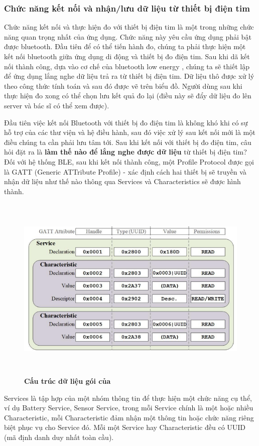 \subsubsection{Chức năng kết nối và nhận/lưu dữ liệu từ thiết bị điện tim}
\mbox{}

Chức năng kết nối và thực hiện đo với thiết bị điện tim là một trong những chức năng quan trọng nhất của ứng dụng. Chức năng này yêu cầu
ứng dụng phải bật được bluetooth. Đầu tiên để có thể tiến hành đo, chúng ta phải thực hiện một kết nối bluetooth giữa ứng dụng di động và
thiết bị đo điện tim. Sau khi dã kết nối thành công, dựa vào cơ chế của bluetooth low energy \cite{intro_ble}, chúng ta sẽ thiết lập để ứng dụng lắng
nghe dữ liệu trả ra từ thiết bị điện tim. Dữ liệu thô được xử lý theo công thức tính toán và sau đó được vẽ trên biểu đồ. Người dùng sau
khi thực hiện đo xong có thể chọn lưu kết quả đo lại (điều này sẽ đẩy dữ liệu đo lên server và bác sĩ có thể xem được).

Đầu tiên việc kết nối Bluetooth với thiết bị đo điện tim là không khó khi có sự hỗ trợ của các thư viện và hệ điều hành, sau đó việc xử lý sau
kết nối mới là một điều chúng ta cần phải lưu tâm tới. Sau khi kết nối với thiết bị đo điện tim, câu hỏi đặt ra là \textbf{làm thế nào
để lắng nghe được dữ liệu} từ thiết bị điện tim? Đối với hệ thống BLE, sau khi kết nối thành công, một Profile Protocol được gọi
là GATT \cite{intro_ble_gatt} (Generic ATTribute Profile) - xác định cách hai thiết bị sẽ truyền và nhận dữ liệu như thế nào thông qua
Services và Characteristics sẽ được hình thành.
\begin{figure}[H]
  \centering
  \includegraphics[width=15cm,height=9cm]{Images/mobile_app/ecg_calculation/ble_gatt.png}
  \caption[Cấu trúc dữ liệu gói của]{\bfseries \fontsize{12pt}{0pt}
  \selectfont Cấu trúc dữ liệu gói của}
  \label{ble_gatt} %
\end{figure}
Services là tập hợp của một nhóm thông tin để thực hiện một chức năng cụ thể,
ví dụ Battery Service, Sensor Service, trong mỗi Service chính là một hoặc nhiều Characteristic, mỗi Characteristic đảm nhận
một thông tin hoặc chức năng riêng biệt phục vụ cho Service đó. Mỗi một Service hay Characteristic đều có UUID (mã định danh duy nhất toàn cầu).

